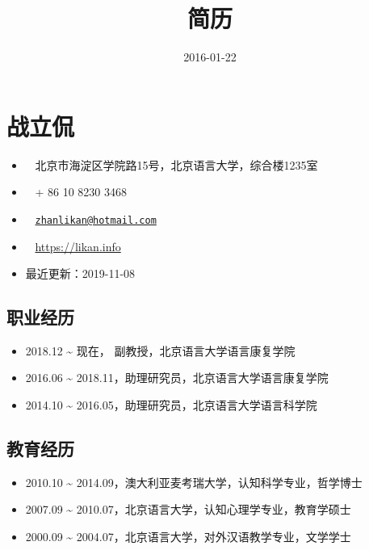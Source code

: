 \documentclass[12pt,]{article}
\title{简历}
\author{}
\date{2016-01-22}
\providecommand{\tightlist}{%
  \setlength{\itemsep}{0pt}\setlength{\parskip}{0pt}}
\begin{document}
\maketitle

\hypertarget{ux6218ux7acbux4f83}{%
\section{战立侃}\label{ux6218ux7acbux4f83}}

\begin{itemize}
\tightlist
\item
  \faUniversity ~ 北京市海淀区学院路15号，北京语言大学，综合楼1235室
\item
  \faPhone* ~ + 86 10 8230 3468
\item
  \faEnvelope[regular] ~
  \href{mailto:zhanlikan@hotmail.com}{\nolinkurl{zhanlikan@hotmail.com}}
\item
  \faGlobe ~ \url{https://likan.info}
\item
  最近更新：2019-11-08
\end{itemize}

\hypertarget{ux804cux4e1aux7ecfux5386}{%
\subsection{职业经历}\label{ux804cux4e1aux7ecfux5386}}

\begin{itemize}
\item
  2018.12 \textasciitilde{} 现在， 副教授，北京语言大学语言康复学院
\item
  2016.06 \textasciitilde{}
  2018.11，助理研究员，北京语言大学语言康复学院
\item
  2014.10 \textasciitilde{} 2016.05，助理研究员，北京语言大学语言科学院
\end{itemize}

\hypertarget{ux6559ux80b2ux7ecfux5386}{%
\subsection{教育经历}\label{ux6559ux80b2ux7ecfux5386}}

\begin{itemize}
\item
  2010.10 \textasciitilde{}
  2014.09，澳大利亚麦考瑞大学，认知科学专业，哲学博士
\item
  2007.09 \textasciitilde{}
  2010.07，北京语言大学，认知心理学专业，教育学硕士
\item
  2000.09 \textasciitilde{}
  2004.07，北京语言大学，对外汉语教学专业，文学学士
\end{itemize}
\end{document}
